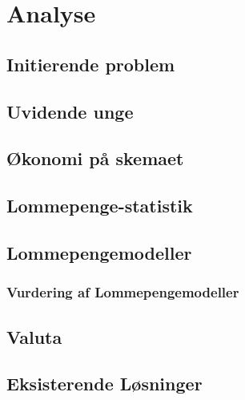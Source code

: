 





\tableofcontents

\chapter{Analyse}

\section{Initierende problem}


\section{Uvidende unge}
\label{UvidendeUnge}


\section{Økonomi på skemaet}
\label{Okonomi}


\section{Lommepenge-statistik}
\label{LommeStat}


\section{Lommepengemodeller}
\label{LommeModeller}

\subsection{Vurdering af Lommepengemodeller}
\label{ModelVurdering}


\section{Valuta}
\label{Valuta}


\section{Eksisterende Løsninger}
